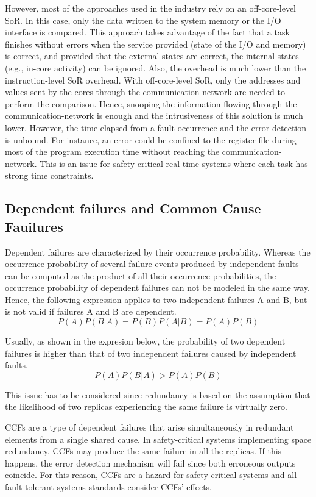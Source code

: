 However, most of the approaches used in the industry rely on an off-core-level SoR. In this case, only the data written to the system memory or the I/O interface is compared. This approach takes advantage of the fact that a task finishes without errors when the service provided (state of the I/O and memory) is correct, and provided that the external states are correct, the internal states (e.g., in-core activity) can be ignored. Also, the overhead is much lower than the instruction-level SoR overhead. With off-core-level SoR, only the addresses and values sent by the cores through the communication-network are needed to perform the comparison. Hence, snooping the information flowing through the communication-network is enough and the intrusiveness of this solution is much lower. However, the time elapsed from a fault occurrence and the error detection is unbound. For instance, an error could be confined to the register file during most of the program execution time without reaching the communication-network. This is an issue for safety-critical real-time systems where each task has strong time constraints.

\bigskip





\subsection{Dependent failures and Common Cause Fauilures}

Dependent failures \cite{Tummeltshammer2009} are characterized by their occurrence probability. Whereas the occurrence probability of several failure events produced by independent faults can be computed as the product of all their occurrence probabilities, the occurrence probability of dependent failures can not be modeled in the same way. Hence, the following expression applies to two independent failures A and B, but is not valid if failures A and B are dependent. \[P(A) P(B|A) = P(B) P(A|B) = P(A) P(B)\]

Usually, as shown in the expresion below, the probability of two dependent failures is higher than that of two independent failures caused by independent faults. \[P(A) P(B|A) > P(A) P(B)\]

This issue has to be considered since redundancy is based on the assumption that the likelihood of two replicas experiencing the same failure is virtually zero.

CCFs are a type of dependent failures that arise simultaneously in redundant elements from a single shared cause. In safety-critical systems implementing space redundancy, CCFs may produce the same failure in all the replicas. If this happens, the error detection mechanism will fail since both erroneous outputs coincide. For this reason, CCFs are a hazard for safety-critical systems and all fault-tolerant systems standards consider CCFs' effects.

